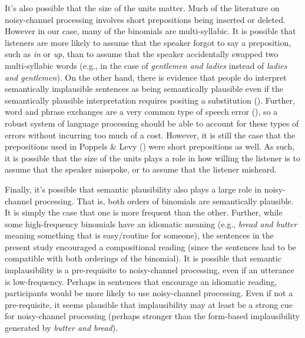 \documentclass[
  12pt,
]{scrartcl}
\begin{document}
It's also possible that the size of the units matter. Much of the
literature on noisy-channel processing involves short prepositions being
inserted or deleted. However in our case, many of the binomials are
multi-syllabic. It is possible that listeners are more likely to assume
that the speaker forgot to say a preposition, such as \emph{in} or
\emph{up}, than to assume that the speaker accidentally swapped two
multi-syllabic words (e.g., in the case of \emph{gentlemen and ladies}
instead of \emph{ladies and gentlemen}). On the other hand, there is
evidence that people do interpret semantically implausible sentences as
being semantically plausible even if the semantically plausible
interpretation requires positing a substitution
(). Further, word and phrase exchanges are a very common type
of speech error (), so a robust system of language processing should be able to
account for these types of errors without incurring too much of a cost.
However, it is still the case that the prepositions used in Poppels \&
Levy ()
were short prepositions as well. As such, it is possible that the size
of the units plays a role in how willing the listener is to assume that
the speaker misspoke, or to assume that the listener misheard.

Finally, it's possible that semantic plausibility also plays a large
role in noisy-channel processing. That is, both orders of binomials are
semantically plausible. It is simply the case that one is more frequent
than the other. Further, while some high-frequency binomials have an
idiomatic meaning (e.g., \emph{bread and butter} meaning something that
is easy/routine for someone), the sentences in the present study
encouraged a compositional reading (since the sentences had to be
compatible with both orderings of the binomial). It is possible that
semantic implausibility is a pre-requisite to noisy-channel processing,
even if an utterance is low-frequency. Perhaps in sentences that
encourage an idiomatic reading, participants would be more likely to use
noisy-channel processing. Even if not a pre-requisite, it seems
plausible that implausibility may at least be a strong cue for
noisy-channel processing (perhaps stronger than the form-based
implausibility generated by \emph{butter and bread}).
\end{document}
